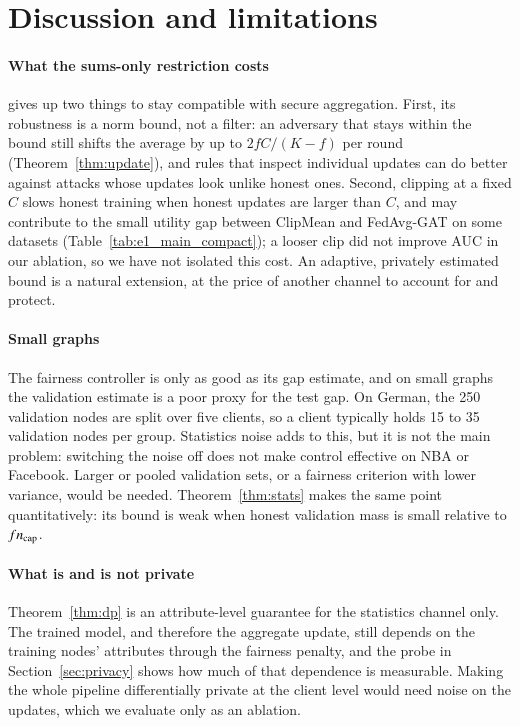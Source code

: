\section{Discussion and limitations}\label{sec:discussion}

\paragraph{What the sums-only restriction costs}
\clamp{} gives up two things to stay compatible with secure aggregation. First, its robustness is a norm bound, not a filter: an adversary that stays within the bound still shifts the average by up to $2fC/(K-f)$ per round (Theorem~\ref{thm:update}), and rules that inspect individual updates can do better against attacks whose updates look unlike honest ones. Second, clipping at a fixed $C$ slows honest training when honest updates are larger than $C$, and may contribute to the small utility gap between ClipMean and FedAvg-GAT on some datasets (Table~\ref{tab:e1_main_compact}); a looser clip did not improve AUC in our ablation, so we have not isolated this cost. An adaptive, privately estimated bound is a natural extension, at the price of another channel to account for and protect.

\paragraph{Small graphs}
The fairness controller is only as good as its gap estimate, and on small graphs the validation estimate is a poor proxy for the test gap. On German, the 250 validation nodes are split over five clients, so a client typically holds 15 to 35 validation nodes per group. Statistics noise adds to this, but it is not the main problem: switching the noise off does not make control effective on NBA or Facebook. Larger or pooled validation sets, or a fairness criterion with lower variance, would be needed. Theorem~\ref{thm:stats} makes the same point quantitatively: its bound is weak when honest validation mass is small relative to $fn_{\mathrm{cap}}$.

\paragraph{What is and is not private}
Theorem~\ref{thm:dp} is an attribute-level guarantee for the statistics channel only. The trained model, and therefore the aggregate update, still depends on the training nodes' attributes through the fairness penalty, and the probe in Section~\ref{sec:privacy} shows how much of that dependence is measurable. Making the whole pipeline differentially private at the client level would need noise on the updates, which we evaluate only as an ablation.

